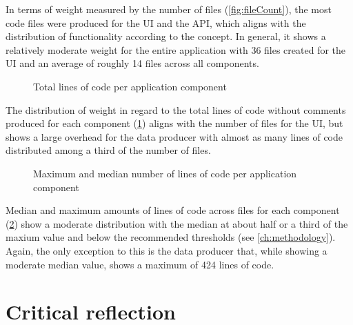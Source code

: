 In terms of weight measured by the number of files (\ref{fig:fileCount}), the most code files were produced for the \ac{UI} and the \ac{API}, which aligns with the distribution of functionality according to the concept. In general, it shows a relatively moderate weight for the entire application with 36 files created for the \ac{UI} and an average of roughly 14 files across all components.

\begin{figure}[h]
\centering

\caption[Lines of code (total)]{Total lines of code per application component\protect}
\label{fig:linesOfCodeTotal}
\end{figure}

The distribution of weight in regard to the total lines of code without comments produced for each component (\ref{fig:linesOfCodeTotal}) aligns with the number of files for the \ac{UI}, but shows a large overhead for the data producer with almost as many lines of code distributed among a third of the number of files.

\begin{figure}[h]
\centering

\caption[Lines of code]{Maximum and median number of lines of code per application component\protect}
\label{fig:linesOfCode}
\end{figure}

Median and maximum amounts of lines of code across files for each component (\ref{fig:linesOfCode}) show a moderate distribution with the median at about half or a third of the maxium value and below the recommended thresholds (see \autoref{ch:methodology}). Again, the only exception to this is the data producer that, while showing a moderate median value, shows a maximum of 424 lines of code.

\section{Critical reflection}
\label{sec:critical-reflection}

